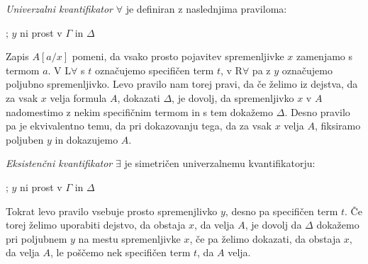 \begin{definicija}
	\emph{Univerzalni kvantifikator} $\forall$ je definiran z naslednjima praviloma:
	\begin{center}
        \begin{bprooftree}
        \end{bprooftree}
        \begin{bprooftree}
        \end{bprooftree} \qquad
        ; $y$ ni prost v $\Gamma$ in $\Delta$
	\end{center}
	Zapis $A[a/x]$ pomeni, da vsako prosto pojavitev spremenljivke $x$ zamenjamo s termom $a$. V L$\forall$ s $t$ označujemo specifičen term $t$, v R$\forall$ pa z $y$ označujemo poljubno spremenljivko. Levo pravilo nam torej pravi, da če želimo iz dejstva, da za vsak $x$ velja formula $A$, dokazati $\Delta$, je dovolj, da spremenljivko $x$ v $A$ nadomestimo z nekim specifičnim termom in s tem dokažemo $\Delta$. Desno pravilo pa je ekvivalentno temu, da pri dokazovanju tega, da za vsak $x$ velja $A$, fiksiramo poljuben $y$ in dokazujemo $A$.
\end{definicija}

\begin{definicija}
    \emph{Eksistenčni kvantifikator} $\exists$ je simetričen univerzalnemu kvantifikatorju:
    \begin{center}
        \begin{bprooftree}
        \end{bprooftree}
        \begin{bprooftree}
        \end{bprooftree} \qquad
        ; $y$ ni prost v $\Gamma$ in $\Delta$
	\end{center}
	Tokrat levo pravilo vsebuje prosto spremenjlivko $y$, desno pa specifičen term $t$. Če torej želimo uporabiti dejstvo, da obstaja $x$, da velja $A$, je dovolj da $\Delta$ dokažemo pri poljubnem $y$ na mestu spremenljivke $x$, če pa želimo dokazati, da obstaja $x$, da velja $A$, le poščemo nek specifičen term $t$, da $A$ velja.
\end{definicija}
